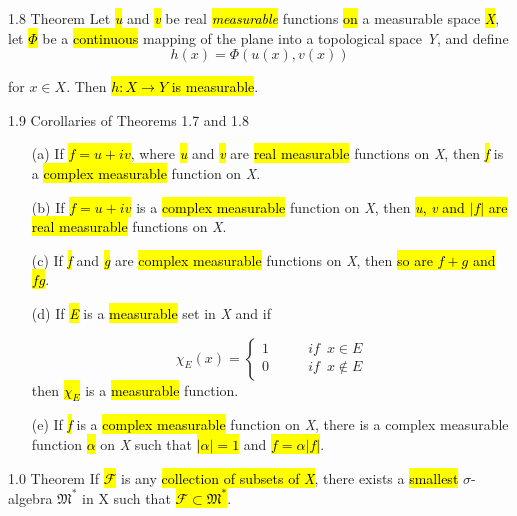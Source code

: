 \documentclass{article}
\begin{document}
\begin{theo}{1.8 Theorem}
Let \hl{\textit{u}} and \hl{\textit{v}} be real \hl{\textit{measurable}} functions \hl{on} a measurable space \hl{\textit{X}}, let \hl{$\Phi$} be a \hl{continuous} mapping of the plane into a topological space \textit{Y}, and define
\begin{displaymath}
  h(x)=\Phi(u(x),v(x))
\end{displaymath}

for $x\in X$. Then \hl{$h:X\rightarrow Y$ is measurable}.

\end{theo}

\begin{theo}{1.9 Corollaries of Theorems 1.7 and 1.8}
\begin{enumerate}
  \item [(a)] If \hl{$f=u+iv$}, where \hl{\textit{u}} and \hl{\textit{v}} are \hl{real measurable} functions on \textit{X}, then \hl{\textit{f}} is a \hl{complex measurable} function on \textit{X}.
  \item [(b)] If \hl{$f=u+iv$} is a \hl{complex measurable} function on \textit{X}, then \hl{\textit{u}, \textit{v} and $|f|$ are real measurable} functions on \textit{X}.
  \item [(c)] If \hl{\textit{f}} and \hl{\textit{g}} are \hl{complex measurable} functions on \textit{X}, then \hl{so are $f+g$ and $fg$}.
  \item [(d)] If \hl{\textit{E}} is a \hl{measurable} set in \textit{X} and if 
  
\begin{displaymath}
  \chi_E(x)=\left\{
\begin{aligned}
1 &\qquad if\enspace x\in E \\
0 &\qquad if\enspace x\notin E
\end{aligned}
\right.
\end{displaymath}
	then \hl{$\chi_E$} is a \hl{measurable} function.
  \item [(e)] If \hl{\textit{f}} is a \hl{complex measurable} function on \textit{X}, there is a complex measurable function \hl{$\alpha$} on \textit{X} such that \hl{$|\alpha|=1$} and \hl{$f=\alpha|f|$}.

\end{enumerate}
\end{theo}

\begin{theo}{1.0 Theorem}
	If \hl{$\mathscr{F}$} is any \hl{collection of subsets of \textit{X}}, there exists a \hl{smallest} $\sigma$-algebra $\mathfrak{M}^*$ in X such that \hl{$\mathscr{F}\subset\mathfrak{M}^*$}.
\end{theo}
\end{document}
